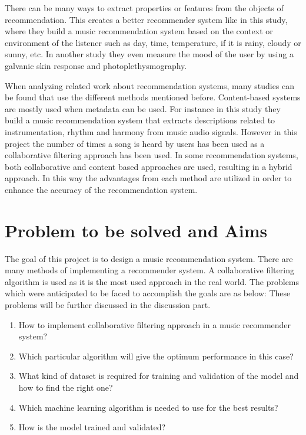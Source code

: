 \documentclass{jot}
\begin{document}
There can be many ways to extract properties or features from the objects of recommendation. This creates a better recommender system like in this study\cite{park_yoo_cho_2006}, where they build a music recommendation system based on the context or environment of the listener such as day, time, temperature, if it is rainy, cloudy or sunny, etc. In another study\cite{ayata_yaslan_kamasak_2018} they even measure the mood of the user by using a galvanic skin response and photoplethysmography.

When analyzing related work about recommendation systems, many studies can be found that use the different methods mentioned before. Content-based systems are mostly used when metadata can be used. For instance in this study\cite{cano_koppenberger_wack_2005} they build a music recommendation system that extracts descriptions related to instrumentation, rhythm and harmony from music audio signals. However in this project the number of times a song is heard by users has been used as a collaborative filtering approach has been used. In some recommendation systems\cite{choi_yoo_kim_suh_2012}\cite{debnath_ganguly_mitra_2008}, both collaborative and content based approaches are used, resulting in a hybrid approach. In this way the advantages from each method are utilized  in order to enhance the accuracy of the recommendation system.

\section{Problem to be solved and Aims}
The goal of this project is to design a music recommendation system. There are many methods of implementing a recommender system. A collaborative filtering algorithm is used as it is the most used approach in the real world.
The problems which were anticipated to be faced to accomplish the goals are as below: These problems  will be further discussed in the discussion part.
\begin{enumerate}
  \item How to implement collaborative filtering approach in a music recommender system?
  \item Which particular algorithm will give the optimum performance in this case?
  \item What kind of dataset is required for training and validation of the model and how to  find the right one?
  \item Which machine learning algorithm is needed to use for the best results?
  \item How is the model trained and validated?
\end{enumerate}
\end{document}

